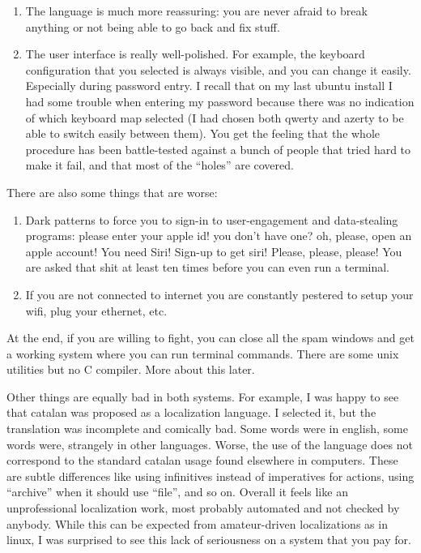 \begin{enumerate}
	\item The language is much more reassuring: you are never afraid to
		break anything or not being able to go back and fix stuff.
	\item The user interface is really well-polished.  For example, the
		keyboard configuration that you selected is always visible,
		and you can change it easily.  Especially during password
		entry.  I recall that on my last ubuntu install I had some
		trouble when entering my password because there was no
		indication of which keyboard map selected (I had chosen both
		qwerty and azerty to be able to switch easily between them).
		You get the feeling that the whole procedure has been
		battle-tested against a bunch of people that tried hard to
		make it fail, and that most of the ``holes'' are covered.
\end{enumerate}


There are also some things that are worse:

\begin{enumerate}
	\item Dark patterns to force you to sign-in to user-engagement and
		data-stealing programs: please enter your apple id! you don't
		have one? oh, please, open an apple account!  You need Siri!
		Sign-up to get siri!  Please, please, please!  You are asked
		that shit at least ten times before you can even run a
		terminal.
	\item If you are not connected to internet you are constantly
		pestered to setup your wifi, plug your ethernet, etc.
\end{enumerate}

At the end, if you are willing to fight, you can close all the spam windows
and get a working system where you can run terminal commands.  There are
some unix utilities but no C compiler.  More about this later.

Other things are equally bad in both systems.  For example, I was happy to
see that catalan was proposed as a localization language.  I selected it, but
the translation was incomplete and comically bad.  Some words were in
english, some words were, strangely in other languages.  Worse, the use of
the language does not correspond to the standard catalan usage
found elsewhere in computers.  These are subtle differences like using
infinitives instead of
imperatives for actions, using ``archive'' when it should use ``file'', and
so on.  Overall it feels like an unprofessional localization work, most
probably automated and not checked by anybody.  While this can be expected
from amateur-driven localizations as in linux, I was surprised to see this
lack of seriousness on a system that you pay for.


